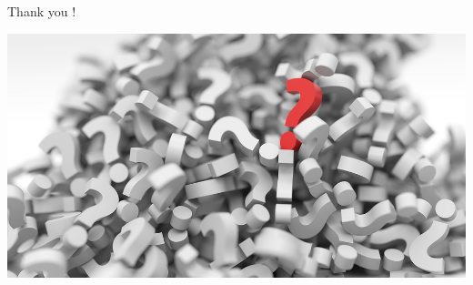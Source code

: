 \documentclass{beamer}
\begin{document}
\begin{frame}{Thank you !}

\includegraphics[width=\textwidth]{Figures/Questions}

\end{frame}
\end{document}
